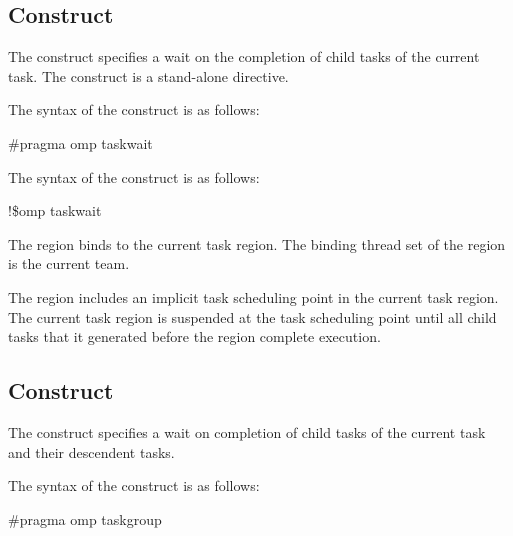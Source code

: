 {{{{\subsection{ Construct}
\label{subsec:taskwait Construct}
\summary
The  construct specifies a wait on the completion of child tasks of the 
current task. The  construct is a stand-alone directive.

\syntax
\ccppspecificstart
The syntax of the  construct is as follows:

\begin{boxedcode}
\#pragma omp taskwait 
\end{boxedcode}
\ccppspecificend

\fortranspecificstart
The syntax of the  construct is as follows:

\begin{boxedcode}
!\$omp taskwait 
\end{boxedcode}
\fortranspecificend

\binding
The  region binds to the current task region. The binding thread set of the 
 region is the current team.

\descr

The  region includes an implicit task scheduling point in the current task 
region. The current task region is suspended at the task scheduling point until all child 
tasks that it generated before the  region complete execution.










\subsection{ Construct}
\label{subsec:taskgroup Construct}
\summary
The  construct specifies a wait on completion of child tasks of the current 
task and their descendent tasks.

\syntax
\ccppspecificstart
The syntax of the  construct is as follows:

\begin{boxedcode}
\#pragma omp taskgroup 
\end{boxedcode}
\ccppspecificend

}}}}
